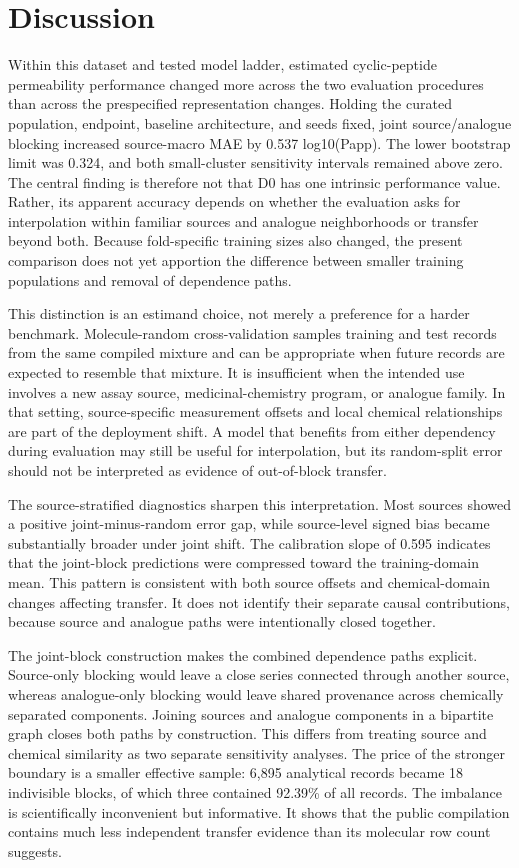 \documentclass[referee,lineno,pdflatex,sn-vancouver-num]{sn-jnl}
\begin{document}
\section{Discussion}

Within this dataset and tested model ladder, estimated cyclic-peptide permeability performance changed more across the two evaluation procedures than across the prespecified representation changes. Holding the curated population, endpoint, baseline architecture, and seeds fixed, joint source/analogue blocking increased source-macro MAE by 0.537 log10(Papp). The lower bootstrap limit was 0.324, and both small-cluster sensitivity intervals remained above zero. The central finding is therefore not that D0 has one intrinsic performance value. Rather, its apparent accuracy depends on whether the evaluation asks for interpolation within familiar sources and analogue neighborhoods or transfer beyond both. Because fold-specific training sizes also changed, the present comparison does not yet apportion the difference between smaller training populations and removal of dependence paths.

This distinction is an estimand choice, not merely a preference for a harder benchmark. Molecule-random cross-validation samples training and test records from the same compiled mixture and can be appropriate when future records are expected to resemble that mixture. It is insufficient when the intended use involves a new assay source, medicinal-chemistry program, or analogue family. In that setting, source-specific measurement offsets and local chemical relationships are part of the deployment shift. A model that benefits from either dependency during evaluation may still be useful for interpolation, but its random-split error should not be interpreted as evidence of out-of-block transfer.

The source-stratified diagnostics sharpen this interpretation. Most sources showed a positive joint-minus-random error gap, while source-level signed bias became substantially broader under joint shift. The calibration slope of 0.595 indicates that the joint-block predictions were compressed toward the training-domain mean. This pattern is consistent with both source offsets and chemical-domain changes affecting transfer. It does not identify their separate causal contributions, because source and analogue paths were intentionally closed together.

The joint-block construction makes the combined dependence paths explicit. Source-only blocking would leave a close series connected through another source, whereas analogue-only blocking would leave shared provenance across chemically separated components. Joining sources and analogue components in a bipartite graph closes both paths by construction. This differs from treating source and chemical similarity as two separate sensitivity analyses. The price of the stronger boundary is a smaller effective sample: 6,895 analytical records became 18 indivisible blocks, of which three contained 92.39\% of all records. The imbalance is scientifically inconvenient but informative. It shows that the public compilation contains much less independent transfer evidence than its molecular row count suggests.
\end{document}

